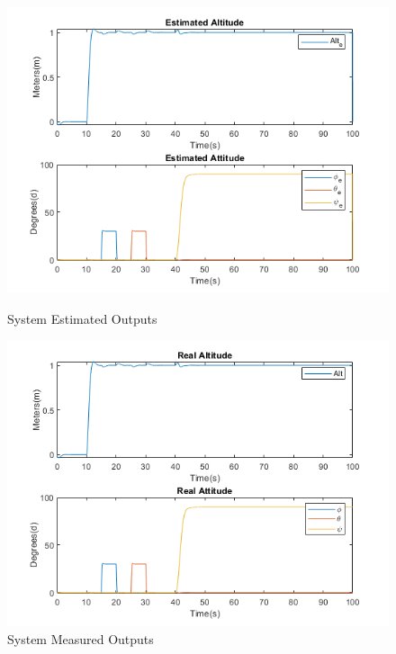 \documentclass[12pt,a4paper,twoside]{report}
\begin{document}
				\begin{figure}[h!]
					\centering
					\begin{minipage}{0.9\textwidth}
						\centering
						\includegraphics[width=1\textwidth]{ModEKFestOutputs.png}
						\caption{System Estimated Outputs}
						\label{fig:systemestimatedouputs}
					\end{minipage}\hfill
					\begin{minipage}{0.9\textwidth}
						\centering
						\includegraphics[width=1\textwidth]{ModEKFrealOutputs.png}
						\caption{System Measured Outputs}
						\label{fig:systemmeasuredouputs}
					\end{minipage}
				\end{figure}
			
\end{document}
